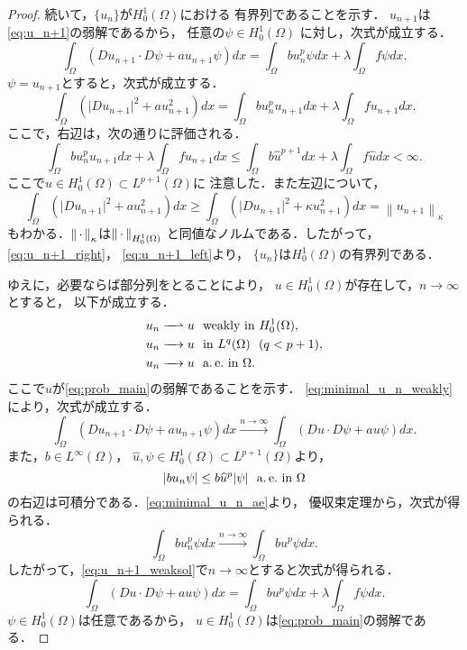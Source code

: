 \begin{proof}
 続いて，$\{u_n\}$が$H_0^1(\Omega)$における
 有界列であることを示す．
 $u_{n+1}$は\eqref{eq:u_n+1}の弱解であるから，
 任意の$\psi \in H_0^1(\Omega)$
 に対し，次式が成立する．
 \begin{equation}
  \int_\Omega (Du_{n+1} \cdot D\psi + a u_{n+1} \psi) dx 
   = \int_\Omega bu_n^p \psi dx + \lambda \int_\Omega f\psi dx.
   \label{eq:u_n+1_weaksol}
 \end{equation}
 $\psi = u_{n+1}$とすると，次式が成立する．
 \[
 \int_\Omega (\lvert Du_{n+1} \rvert^2 
 + a u_{n+1} ^2) dx 
 = \int_\Omega bu_n^p u_{n+1} dx 
 + \lambda \int_\Omega f u_{n+1} dx.
 \]
 ここで，右辺は，次の通りに評価される．
 \begin{equation}
  \int_\Omega bu_n^p u_{n+1} dx 
   + \lambda \int_\Omega f u_{n+1} dx
 \leq \int_\Omega b\hat{u}^{p+1} dx + \lambda
   \int_\Omega f \hat{u} dx < \infty. \label{eq:u_n+1_right}
 \end{equation}
 ここで$\hat{u} \in H_0^1(\Omega) \subset L^{p+1}(\Omega)$に
 注意した．また左辺について，
 \begin{equation}
  \int_\Omega (\lvert Du_{n+1} \rvert^2 
   + a u_{n+1}^2) dx 
 \geq \int_\Omega \left( \lvert Du_{n+1} \rvert^2 + \kappa
         u_{n+1} ^2 \right) dx = \left\| u_{n+1} 
                                                \right\|_{\kappa}
  \label{eq:u_n+1_left}
 \end{equation}
 もわかる．$\left\|\, \cdot \, \right\|_\kappa$は$\left\|\, \cdot \, \right\|_{H_0^1(\Omega)}$
 と同値なノルムである．したがって，\eqref{eq:u_n+1_right}，
 \eqref{eq:u_n+1_left}より，
 $\{u_n\}$は$H_0^1(\Omega)$の有界列である．

 ゆえに，必要ならば部分列をとることにより，
 $u \in H_0^1(\Omega)$が存在して，$n \to \infty$とすると，
 以下が成立する．
 \begin{align}
  u_n \xrightharpoonup{ \mbox{ ~ } } u & \ \ \text{weakly~} \tin
  H_0^1(\Omega), \label{eq:minimal_u_n_weakly} \\
  u_n \xrightarrow{ \mbox{ ~ } } u & \ \ \tin L^q(\Omega) \notag \ \
   (q < p+1), \\
  u_n \xrightarrow{ \mbox{ ~ } } u & \ \ \ae \tin \Omega. 
    \label{eq:minimal_u_n_ae}
 \end{align}
 ここで$u$が\ref{eq:prob_main}の弱解であることを示す．
 \eqref{eq:minimal_u_n_weakly}により，次式が成立する．
 \[
 \int_\Omega (Du_{n+1} \cdot D\psi + a u_{n+1} \psi) dx
 \xrightarrow{n \to \infty}
 \int_\Omega (Du \cdot D\psi + a u \psi) dx.
 \]
 また，$b \in L^\infty(\Omega)$，
 $\hat{u}, \psi \in H_0^1(\Omega) \subset L^{p+1}(\Omega)$より，
 \[
  \left\lvert bu_n \psi \right\rvert \leq b \widehat{u}^p \lvert\psi\rvert \ \ \text{a.\,e.}~
 \text{in}~ \Omega
 \]
 の右辺は可積分である．\eqref{eq:minimal_u_n_ae}より，
 優収束定理から，次式が得られる．
 \[
 \int_\Omega bu_n^p \psi dx \xrightarrow{n \to \infty} 
 \int_\Omega bu^p \psi dx.
 \]
 したがって，\eqref{eq:u_n+1_weaksol}で$n \to \infty$とすると次式が得られる．
 \begin{equation}
  \int_\Omega (Du \cdot D\psi + a u \psi) dx 
   = \int_\Omega bu^p \psi dx + \lambda \int_\Omega f\psi dx.
   \label{eq:minimal_u_weaksol}
 \end{equation}
 $\psi \in H_0^1(\Omega)$は任意であるから，
 $u \in H_0^1(\Omega)$は\ref{eq:prob_main}の弱解である．
 

\end{proof}
